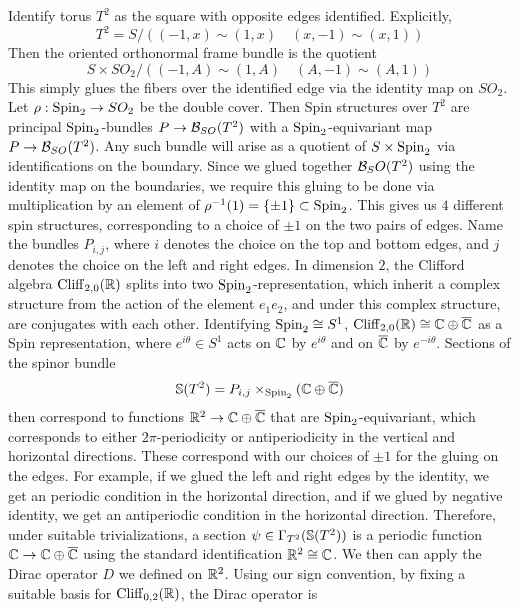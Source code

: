 \begin{exmp}
Identify torus $T^2$ as the square with opposite edges identified. Explicitly,
\[
T^2 = S / \left( (-1, x) \sim (1,x) \quad (x, -1) \sim (x, 1) \right)
\]
Then the oriented orthonormal frame bundle is the quotient
\[
S \times SO_2 / \left( (-1, A) \sim (1, A) \quad (A,-1) \sim (A, 1) \right)
\]
This simply glues the fibers over the identified edge via the identity map on $SO_2$.
Let $\rho : \Spin_2 \to SO_2$ be the double cover. Then Spin structures over $T^2$
are principal $\Spin_2$-bundles $P \to \B_{SO}(T^2)$ with a $\Spin_2$-equivariant map
$P \to \B_{SO}(T^2)$. Any such bundle will arise as a quotient of $S \times \Spin_2$
via identifications on the boundary. Since we glued together $\B_SO(T^2)$ using the
identity map on the boundaries, we require this gluing to be done via multiplication
by an element of $\rho\inv(1) = \set{\pm 1} \subset \Spin_2$. This gives us $4$
different spin structures, corresponding to a choice of $\pm 1$ on the two pairs of
edges. Name the bundles $P_{i,j}$, where $i$ denotes the choice on the top and
bottom edges, and $j$ denotes the choice on the left and right edges. In dimension $2$,
the Clifford algebra $\Cliff_{2,0}(\R)$ splits into two $\Spin_2$-representation,
which inherit a complex structure from the action of the element $e_1e_2$, and under
this complex structure, are conjugates with each other. Identifying
$\Spin_2 \cong S^1$, $\Cliff_{2,0}(\R) \cong \C \oplus \overline{\C}$ as a Spin
representation, where $e^{i\theta} \in S^1$ acts on $\C$ by $e^{i\theta}$ and on
$\overline{\C}$ by $e^{-i\theta}$. Sections of the spinor bundle
\[
\S(T^2) = P_{i,j} \times_{\Spin_2} (\C \oplus \overline{\C})
\]
then correspond to functions $\R^2 \to \C \oplus \overline{\C}$ that are
$\Spin_2$-equivariant, which corresponds to  either $2\pi$-periodicity or
antiperiodicity in the vertical and horizontal directions. These correspond with our
choices of $\pm 1$ for the gluing on the edges. For example, if we glued the left and
right edges by the identity, we get an periodic condition in the horizontal direction,
and if we glued by negative identity, we get an antiperiodic condition in the horizontal
direction. Therefore, under suitable trivializations, a section
$\psi \in \Gamma_{T^2}(\S(T^2))$ is a periodic function
$\C \to \C \oplus \overline{\C}$ using the standard identification $\R^2 \cong \C$.
We then can apply the Dirac operator $D$ we defined on $\R^2$. Using our sign
convention, by fixing a suitable basis for  $\Cliff_{0,2}(\R)$, the Dirac operator is

\end{exmp}
